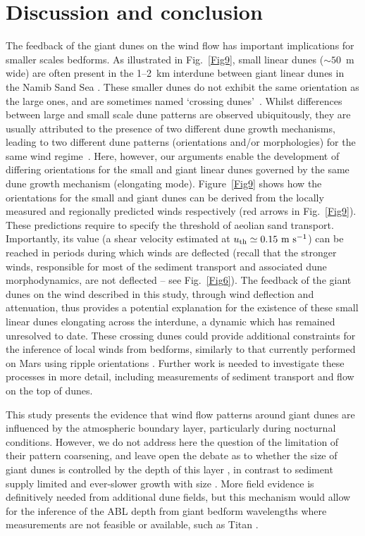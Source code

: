 \section{Discussion and conclusion}
The feedback of the giant dunes on the wind flow has important implications for smaller scales bedforms. As illustrated in Fig.~\ref{Fig9}, small linear dunes ($\sim50$~m wide) are often present in the 1--2~km interdune between giant linear dunes in the Namib Sand Sea \citep{Livingstone2010}. These smaller dunes do not exhibit the same orientation as the large ones, and are sometimes named `crossing dunes'~\citep{Chand22}. Whilst differences between large and small scale dune patterns are observed ubiquitously, they are usually attributed to the presence of two different dune growth mechanisms, leading to two different dune patterns (orientations and/or morphologies) for the same wind regime~\citep{Courrech2014, Runyon2017, lu2017, Song2019, Gadal2020, Hu2021}. Here, however, our arguments enable the development of differing orientations for the small and giant linear dunes governed by the same dune growth mechanism (elongating mode). Figure~\ref{Fig9} shows how the orientations for the small and giant dunes can be derived from the locally measured and regionally predicted winds respectively (red arrows in Fig.~\ref{Fig9}). These predictions require to specify the threshold of aeolian sand transport. Importantly, its value (a shear velocity estimated at $u_{\textup{th}} \simeq 0.15~\textup{m}~\textup{s}^{-1}$) can be reached in periods during which winds are deflected (recall that the stronger winds, responsible for most of the sediment transport and associated dune morphodynamics, are not deflected -- see Fig.~\ref{Fig6}). The feedback of the giant dunes on the wind described in this study, through wind deflection and attenuation, thus provides a potential explanation for the existence of these small linear dunes elongating across the interdune, a dynamic which has remained unresolved to date. These crossing dunes could provide additional constraints for the inference of local winds from bedforms, similarly to that currently performed on Mars using ripple orientations \citep{Liu2015, Hood2021}. Further work is needed to investigate these processes in more detail, including measurements of sediment transport and flow on the top of dunes.

This study presents the evidence that wind flow patterns around giant dunes are influenced by the atmospheric boundary layer, particularly during nocturnal conditions. However, we do not address here the question of the limitation of their pattern coarsening, and leave open the debate as to whether the size of giant dunes is controlled by the depth of this layer \citep{Andreotti2009}, in contrast to sediment supply limited and ever-slower growth with size \citep{Werner1999, Gunn2021b}. More field evidence is definitively needed from additional dune fields, but this mechanism would allow for the inference of the ABL depth from giant bedform wavelengths where measurements are not feasible or available, such as Titan \citep{Lorenz2010}.

